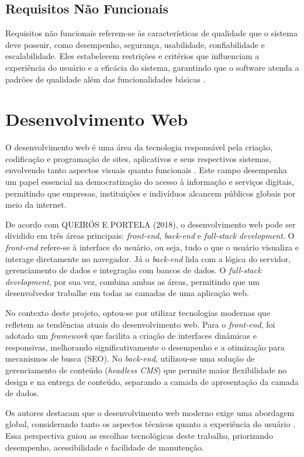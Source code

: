 \subsection{Requisitos Não Funcionais}
Requisitos não funcionais referem-se às características de qualidade que o sistema deve possuir, como desempenho, segurança, usabilidade, confiabilidade e escalabilidade. Eles estabelecem restrições e critérios que influenciam a experiência do usuário e a eficácia do sistema, garantindo que o software atenda a padrões de qualidade além das funcionalidades básicas \citep{pressman2021engenharia}.

\section{Desenvolvimento Web}

O desenvolvimento web é uma área da tecnologia responsável pela criação, codificação e programação de sites, aplicativos e seus respectivos sistemas, envolvendo tanto aspectos visuais quanto funcionais \citep{queirosintrodução}. Este campo desempenha um papel essencial na democratização do acesso à informação e serviços digitais, permitindo que empresas, instituições e indivíduos alcancem públicos globais por meio da internet.

De acordo com QUEIRÓS E PORTELA (2018), o desenvolvimento web pode ser dividido em três áreas principais: \textit{front-end}, \textit{back-end} e \textit{full-stack development}. O \textit{front-end} refere-se à interface do usuário, ou seja, tudo o que o usuário visualiza e interage diretamente no navegador. Já o \textit{back-end} lida com a lógica do servidor, gerenciamento de dados e integração com bancos de dados. O \textit{full-stack development}, por sua vez, combina ambas as áreas, permitindo que um desenvolvedor trabalhe em todas as camadas de uma aplicação web.

No contexto deste projeto, optou-se por utilizar tecnologias modernas que refletem as tendências atuais do desenvolvimento web. Para o \textit{front-end}, foi adotado um \textit{framework} que facilita a criação de interfaces dinâmicas e responsivas, melhorando significativamente o desempenho e a otimização para mecanismos de busca (SEO). No \textit{back-end}, utilizou-se uma solução de gerenciamento de conteúdo (\textit{headless CMS}) que permite maior flexibilidade no design e na entrega de conteúdo, separando a camada de apresentação da camada de dados.

Os autores destacam que o desenvolvimento web moderno exige uma abordagem global, considerando tanto os aspectos técnicos quanto a experiência do usuário . Essa perspectiva guiou as escolhas tecnológicas deste trabalho, priorizando desempenho, acessibilidade e facilidade de manutenção.

